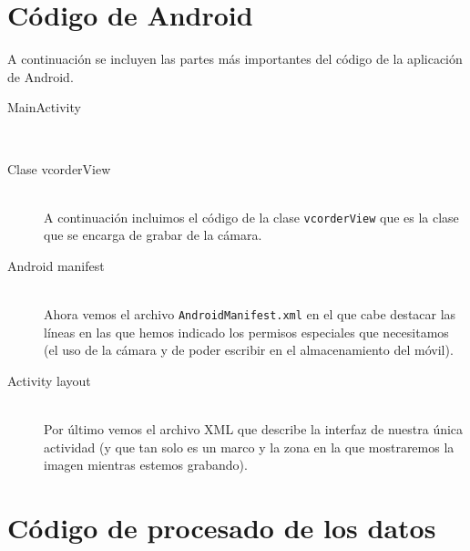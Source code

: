 \documentclass[a4paper,openright, 12pt]{book}
\begin{document}
\chapter{Código de Android}
A continuación se incluyen las partes más importantes del código de la aplicación de Android.
\begin{description}

\item [MainActivity] \hfill \\


\newpage
\item [Clase vcorderView] \hfill \\
A continuación incluimos el código de la clase \lstinline|vcorderView| que es la clase que se encarga de grabar de la cámara.


\item [Android manifest] \hfill \\
Ahora vemos el archivo \lstinline|AndroidManifest.xml| en el que cabe destacar las líneas en las que hemos indicado los permisos especiales que necesitamos (el uso de la cámara y de poder escribir en el almacenamiento del móvil).


\item [Activity layout] \hfill \\
Por último vemos el archivo XML que describe la interfaz de nuestra única actividad (y que tan solo es un marco y la zona en la que mostraremos la imagen mientras estemos grabando).

\end{description}

\chapter{Código de procesado de los datos}

\newpage


\cleardoublepage
{}
\end{document}
